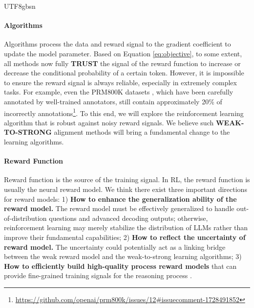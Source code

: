 \documentclass[11pt, a4paper, logo, copyright, nonumbering]{deepseek}
\begin{document}
\begin{CJK*}{UTF8}{gbsn}
\paragraph{Algorithms} Algorithms process the data and reward signal to the gradient coefficient to update the model parameter. 
Based on Equation \ref{eq:objective}, to some extent, all methods now fully \textbf{TRUST} the signal of the reward function to increase or decrease the conditional probability of a certain token.
However, it is impossible to ensure the reward signal is always reliable, especially in extremely complex tasks. For example, even the PRM800K datasets \citep{lightman2023let}, which have been carefully annotated by well-trained annotators, still contain approximately 20\% of incorrectly annotations\footnote{\url{https://github.com/openai/prm800k/issues/12\#issuecomment-1728491852}}. To this end, we will explore the reinforcement learning algorithm that is robust against noisy reward signals.  We believe such \textbf{WEAK-TO-STRONG} \citep{burns2023weak} alignment methods will bring a fundamental change to the learning algorithms.

\paragraph{Reward Function} Reward function is the source of the training signal.
In RL, the reward function is usually the neural reward model.
We think there exist three important directions for reward models:
1) \textbf{How to enhance the generalization ability of the reward model.} The reward model must be effectively generalized to handle out-of-distribution questions and advanced decoding outputs; otherwise, reinforcement learning may merely stabilize the distribution of LLMs rather than improve their fundamental capabilities;
2) \textbf{How to reflect the uncertainty of reward model.} The uncertainty could potentially act as a linking bridge between the weak reward model and the weak-to-strong learning algorithms;
3) \textbf{How to efficiently build high-quality process reward models} that can provide fine-grained training signals for the reasoning process \citep{lightman2023let,wang2023math}.





\end{CJK*}
\end{document}
